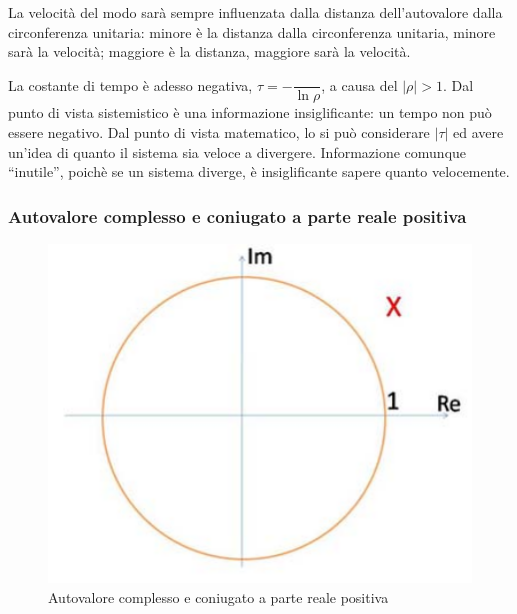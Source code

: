 \documentclass[a4paper]{report}
\begin{document}
La velocit\`a del modo sar\`a sempre influenzata dalla distanza
dell'autovalore dalla circonferenza unitaria: minore \`e la distanza
dalla circonferenza unitaria, minore sar\`a la velocit\`a; maggiore
\`e la distanza, maggiore sar\`a la velocit\`a.

La costante di tempo \`e adesso negativa, $\tau = - \dfrac{}{\ln
  \rho}$, a causa del $|\rho| > 1$. Dal punto di vista sistemistico
\`e una informazione insiglificante: un tempo non pu\`o essere
negativo. Dal punto di vista matematico, lo si pu\`o considerare
$|\tau|$ ed avere un'idea di quanto il sistema sia veloce a
divergere. Informazione comunque ``inutile'', poich\`e se un sistema
diverge, \`e insiglificante sapere quanto velocemente.

\subsubsection{Autovalore complesso e coniugato a parte reale positiva}
\begin{figure}[!h]
  \begin{center}
    \includegraphics[scale=0.3]{./figures/autovaloreComplessoConiugatoRealePositivoInstabile00.png} 
    \caption{Autovalore complesso e coniugato a parte reale
      positiva}\label{fig:autovaloreComplessoConiugatoRealePositivoInstabile00.png} 
  \end{center}
\end{figure}
\end{document}
